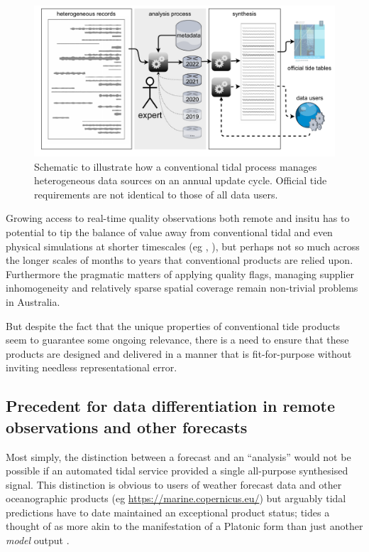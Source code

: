\begin{figure}[H]\centering
        \includegraphics[width=\figwidthFull]{figures/diagrams/tideSchematic.pdf} 
        \caption{Schematic to illustrate how a conventional tidal process manages heterogeneous data sources on an annual update cycle.  Official tide requirements are not identical to those of all data users. }
        \label{fig:tidePractice}
\end{figure}   


Growing access to real-time quality observations both remote and insitu has to potential to tip the balance of value away from conventional tidal and even physical simulations at shorter timescales (eg \citep{10.3389/fmars.2019.00437}, \citep{10.3389/fmars.2020.00260} ), but perhaps not so much across the longer scales of months to years that conventional products are relied upon.
Furthermore the pragmatic matters of applying quality flags, managing supplier inhomogeneity and relatively sparse spatial coverage remain non-trivial problems in Australia.


But despite the fact that the unique properties of conventional tide products seem to guarantee some ongoing relevance, there is a need to ensure that these products are designed and delivered in a manner that is fit-for-purpose without inviting needless representational error. 


\subsection{Precedent for data differentiation in remote observations and other forecasts}

Most simply, the distinction between a forecast and an ``analysis'' would not be possible if an automated tidal service provided a single all-purpose synthesised signal.
This distinction is obvious to users of weather forecast data and other oceanographic products (eg \url{https://marine.copernicus.eu/}) but arguably tidal predictions have to date maintained an exceptional product status; tides a thought of as more akin to the manifestation of a Platonic form than just another \textit{model} output \citep{Jay:2003bj} \citep{10.1029/2018rg000636}.


